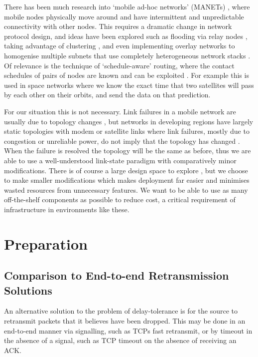 \documentclass[withindex,glossary,openany]{cam-thesis}
\begin{document}
There has been much research into `mobile ad-hoc networks' (MANETs) \cite{ABOLHASAN2004}, where mobile nodes physically move around and have intermittent and unpredictable connectivity with other nodes. This requires a dramatic change in network protocol design, and ideas have been explored such as flooding via relay nodes \cite{CLAUSEN2003}, taking advantage of clustering \cite{ONUR2022}, and even implementing overlay networks to homogenise multiple subnets that use completely heterogeneous network stacks \cite{SCOTT2007}. Of relevance is the technique of `schedule-aware' routing, where the contact schedules of pairs of nodes are known and can be exploited \cite{GARETTO2009}. For example this is used in space networks where we know the exact time that two satellites will pass by each other on their orbits, and send the data on that prediction.

For our situation this is not necessary. Link failures in a mobile network are usually due to topology changes \cite{DIVECHA2007}, but networks in developing regions have largely static topologies with modem or satellite links where link failures, mostly due to congestion or unreliable power, do not imply that the topology has changed \cite{DEMMER2007}. When the failure is resolved the topology will be the same as before, thus we are able to use a well-understood link-state paradigm with comparatively minor modifications. There is of course a large design space to explore \cite{FARRELL2006}, but we choose to make smaller modifications which makes deployment far easier and minimises wasted resources from unnecessary features. We want to be able to use as many off-the-shelf components as possible to reduce cost, a critical requirement of infrastructure in environments like these.


\chapter{Preparation}

\section{Comparison to End-to-end Retransmission Solutions}
\label{sec:retransmission}

An alternative solution to the problem of delay-tolerance  is for the source to retransmit packets that it believes have been dropped. This may be done in an end-to-end manner via signalling, such as TCPs fast retransmit, or by timeout in the absence of a signal, such as TCP timeout on the absence of receiving an ACK.
\end{document}
